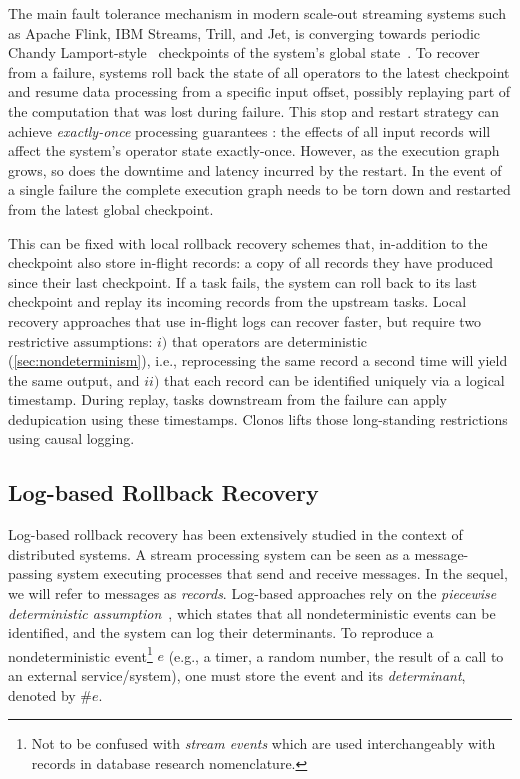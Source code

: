 \documentclass[sigconf]{acmart}
\begin{document}
The main fault tolerance mechanism in modern scale-out streaming systems such as Apache Flink, IBM Streams, Trill, and Jet, is converging towards periodic Chandy Lamport-style~\cite{chandy1985distributed} checkpoints of the system's global state~\cite{CarboneKE15, CarboneEF17, ChandramouliGB15, SilvaZD16}.
To recover from a failure, systems roll back the state of all operators to the latest checkpoint and resume data processing from a specific input offset, possibly replaying part of the computation that was lost during failure.
This stop and restart strategy can achieve \textit{exactly-once} processing guarantees \cite{CarboneEF17}: the effects of all input records will affect the system's operator state exactly-once. However, as the execution graph grows, so does the downtime and latency incurred by the restart. In the event of a single failure the complete execution graph needs to be torn down and restarted from the latest global checkpoint. 

This can be fixed with local rollback recovery schemes that, in-addition to the checkpoint also store in-flight records: a copy of all records they have produced since their last checkpoint. If a task fails, the system can roll back to its last checkpoint and replay its incoming records from the upstream tasks. Local recovery approaches that use in-flight logs \cite{migliavacca2010seep, FernandezMK13} can recover faster, but require two restrictive assumptions:
$i)$ that operators are deterministic (\autoref{sec:nondeterminism}), i.e., reprocessing the same record a second time will yield the same output, and
$ii)$ that each record can be identified uniquely via a logical timestamp. During replay, tasks downstream from the failure can apply dedupication using these timestamps. Clonos lifts those long-standing restrictions using causal logging.

\subsection{Log-based Rollback Recovery}
\label{sec:logging}

Log-based rollback recovery has been extensively studied in the context of distributed systems. A stream processing system can be seen as a message-passing system executing processes that send and receive messages. In the sequel, we will refer to messages as \textit{records}. 
Log-based approaches rely on the \emph{piecewise deterministic assumption}~\cite{elnozahy2002survey}, which states that all nondeterministic events can be identified, and the system can log their determinants.
To reproduce a nondeterministic event\footnote{Not to be confused with \emph{stream events} which are used interchangeably with records in database research nomenclature.} $e$ (e.g., a timer, a random number, the result of a call to an external service/system), one must store the event and its \textit{determinant}, denoted by \#$e$. 
\end{document}
